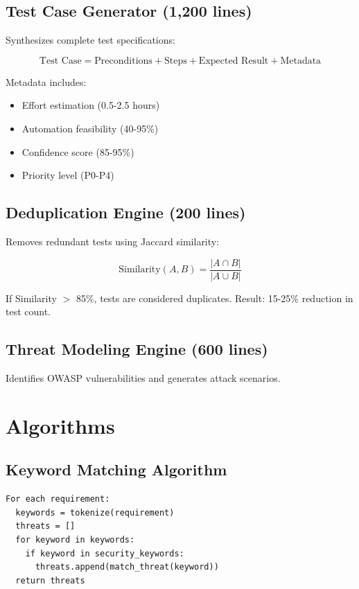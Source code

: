 \documentclass[12pt,oneside]{report}
\begin{document}
\subsection{Test Case Generator (1,200 lines)}

Synthesizes complete test specifications:

\begin{equation}
\text{Test Case} = \text{Preconditions} + \text{Steps} + \text{Expected Result} + \text{Metadata}
\end{equation}

Metadata includes:
\begin{itemize}
    \item Effort estimation (0.5-2.5 hours)
    \item Automation feasibility (40-95\%)
    \item Confidence score (85-95\%)
    \item Priority level (P0-P4)
\end{itemize}

\subsection{Deduplication Engine (200 lines)}

Removes redundant tests using Jaccard similarity:

\begin{equation}
\text{Similarity}(A, B) = \frac{|A \cap B|}{|A \cup B|}
\end{equation}

If Similarity $>$ 85\%, tests are considered duplicates.
Result: 15-25\% reduction in test count.

\subsection{Threat Modeling Engine (600 lines)}

Identifies OWASP vulnerabilities and generates attack scenarios.

\section{Algorithms}

\subsection{Keyword Matching Algorithm}

\begin{verbatim}
For each requirement:
  keywords = tokenize(requirement)
  threats = []
  for keyword in keywords:
    if keyword in security_keywords:
      threats.append(match_threat(keyword))
  return threats
\end{verbatim}
\end{document}
